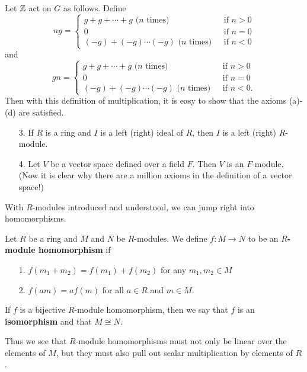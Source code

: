 \begin{prf}
    Let $\mathbb{Z}$ act on $G$ as follows. Define 
    \[
        ng = 
        \begin{cases}
            g + g + \cdots + g \text{ ($n$ times)} & \text{ if } n  > 0\\ 
            0 & \text{ if } n = 0\\
            (-g) + (-g) \cdots (-g) \text{ ($n$ times) } & \text{ if } n < 0
        \end{cases}
    \]
    and 
    \[
        gn = 
        \begin{cases}
            g + g + \cdots + g \text{ ($n$ times)} & \text{ if } n  > 0\\ 
            0 & \text{ if } n = 0\\
            (-g) + (-g) \cdots (-g) \text{ ($n$ times) } & \text{ if } n < 0.
        \end{cases}
    \]
    Then with this definition of multiplication, it is easy to
    show that the axioms (a)-(d) are satisfied.
\end{prf}

\begin{itemize}
    \item[3.] If $R$ is a ring and $I$ is a left (right) ideal of
    $R$, then $I$ is a left (right) $R$-module. 

    \item[4.] Let $V$ be a vector space defined over a field $F$.
    Then $V$ is an $F$-module. (Now it is clear why there are a
    million axioms in the definition of a vector space!)
\end{itemize}

With $R$-modules introduced and understood, we can jump right into
homomorphisms. 
\begin{definition}
    Let $R$ be a ring and $M$ and $N$ be $R$-modules. We define
    $f: M \to N$ to be an \textbf{$R$-module homomorphism} if 
    \begin{itemize}
        \item[1.] $f(m_1 + m_2) = f(m_1) + f(m_2)$ for any $m_1,
        m_2 \in M$ 
        \item[2.] $f(am) = af(m)$ for all $a \in R$ and $m \in M$.
    \end{itemize}
    If $f$ is a bijective $R$-module homomorphism, then we say
    that $f$ is an \textbf{isomorphism} and that $M \cong N$.
\end{definition}
Thus we see that $R$-module homomorphisms must not only be linear
over the elements of $M$, but they must also pull out scalar
multiplication by elements of $R$.

